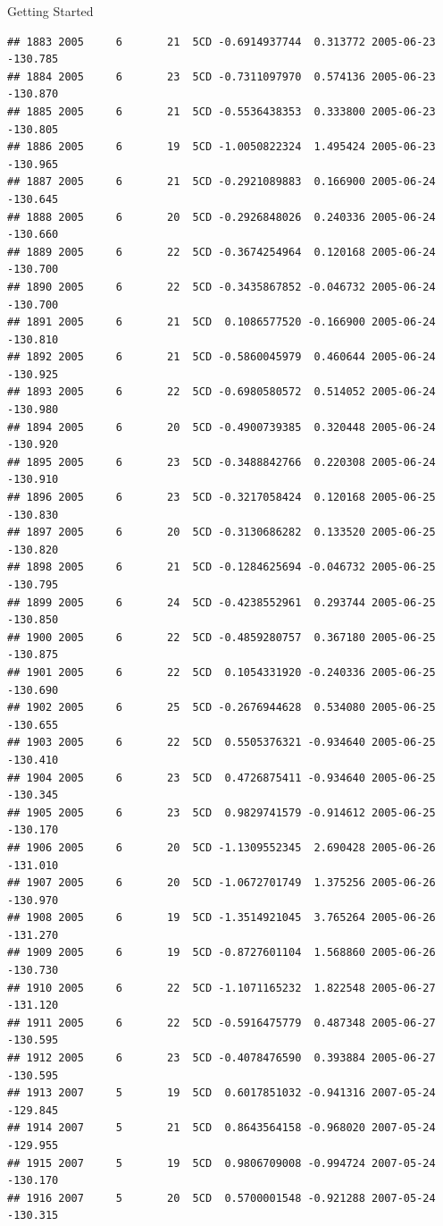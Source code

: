 \documentclass[
  ignorenonframetext,
]{beamer}
\begin{document}
\begin{frame}[fragile]{Getting Started}
\begin{verbatim}
## 1883 2005     6       21  5CD -0.6914937744  0.313772 2005-06-23 -130.785
## 1884 2005     6       23  5CD -0.7311097970  0.574136 2005-06-23 -130.870
## 1885 2005     6       21  5CD -0.5536438353  0.333800 2005-06-23 -130.805
## 1886 2005     6       19  5CD -1.0050822324  1.495424 2005-06-23 -130.965
## 1887 2005     6       21  5CD -0.2921089883  0.166900 2005-06-24 -130.645
## 1888 2005     6       20  5CD -0.2926848026  0.240336 2005-06-24 -130.660
## 1889 2005     6       22  5CD -0.3674254964  0.120168 2005-06-24 -130.700
## 1890 2005     6       22  5CD -0.3435867852 -0.046732 2005-06-24 -130.700
## 1891 2005     6       21  5CD  0.1086577520 -0.166900 2005-06-24 -130.810
## 1892 2005     6       21  5CD -0.5860045979  0.460644 2005-06-24 -130.925
## 1893 2005     6       22  5CD -0.6980580572  0.514052 2005-06-24 -130.980
## 1894 2005     6       20  5CD -0.4900739385  0.320448 2005-06-24 -130.920
## 1895 2005     6       23  5CD -0.3488842766  0.220308 2005-06-24 -130.910
## 1896 2005     6       23  5CD -0.3217058424  0.120168 2005-06-25 -130.830
## 1897 2005     6       20  5CD -0.3130686282  0.133520 2005-06-25 -130.820
## 1898 2005     6       21  5CD -0.1284625694 -0.046732 2005-06-25 -130.795
## 1899 2005     6       24  5CD -0.4238552961  0.293744 2005-06-25 -130.850
## 1900 2005     6       22  5CD -0.4859280757  0.367180 2005-06-25 -130.875
## 1901 2005     6       22  5CD  0.1054331920 -0.240336 2005-06-25 -130.690
## 1902 2005     6       25  5CD -0.2676944628  0.534080 2005-06-25 -130.655
## 1903 2005     6       22  5CD  0.5505376321 -0.934640 2005-06-25 -130.410
## 1904 2005     6       23  5CD  0.4726875411 -0.934640 2005-06-25 -130.345
## 1905 2005     6       23  5CD  0.9829741579 -0.914612 2005-06-25 -130.170
## 1906 2005     6       20  5CD -1.1309552345  2.690428 2005-06-26 -131.010
## 1907 2005     6       20  5CD -1.0672701749  1.375256 2005-06-26 -130.970
## 1908 2005     6       19  5CD -1.3514921045  3.765264 2005-06-26 -131.270
## 1909 2005     6       19  5CD -0.8727601104  1.568860 2005-06-26 -130.730
## 1910 2005     6       22  5CD -1.1071165232  1.822548 2005-06-27 -131.120
## 1911 2005     6       22  5CD -0.5916475779  0.487348 2005-06-27 -130.595
## 1912 2005     6       23  5CD -0.4078476590  0.393884 2005-06-27 -130.595
## 1913 2007     5       19  5CD  0.6017851032 -0.941316 2007-05-24 -129.845
## 1914 2007     5       21  5CD  0.8643564158 -0.968020 2007-05-24 -129.955
## 1915 2007     5       19  5CD  0.9806709008 -0.994724 2007-05-24 -130.170
## 1916 2007     5       20  5CD  0.5700001548 -0.921288 2007-05-24 -130.315

\end{verbatim}
\end{frame}
\end{document}
